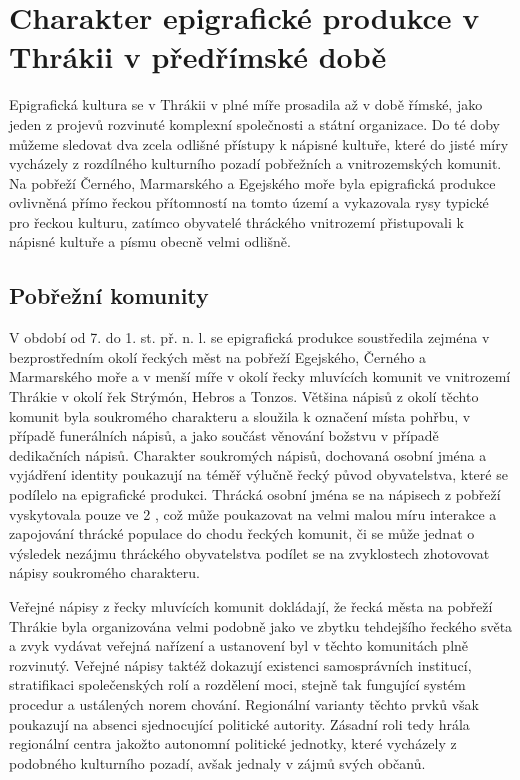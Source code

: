 \section[charakter-epigrafické-produkce-v-thrákii-v-předřímské-době]{Charakter epigrafické produkce v Thrákii v předřímské době}

Epigrafická kultura se v Thrákii v plné míře prosadila až v době římské, jako jeden z projevů rozvinuté komplexní společnosti a státní organizace. Do té doby můžeme sledovat dva zcela odlišné přístupy k nápisné kultuře, které do jisté míry vycházely z rozdílného kulturního pozadí pobřežních a vnitrozemských komunit. Na pobřeží Černého, Marmarského a Egejského moře byla epigrafická produkce ovlivněná přímo řeckou přítomností na tomto území a vykazovala rysy typické pro řeckou kulturu, zatímco obyvatelé thráckého vnitrozemí přistupovali k nápisné kultuře a písmu obecně velmi odlišně.

\subsection[pobřežní-komunity]{Pobřežní komunity}

V období od 7. do 1. st. př. n. l. se epigrafická produkce soustředila zejména v bezprostředním okolí řeckých měst na pobřeží Egejského, Černého a Marmarského moře a v menší míře v okolí řecky mluvících komunit ve vnitrozemí Thrákie v okolí řek Strýmón, Hebros a Tonzos. Většina nápisů z okolí těchto komunit byla soukromého charakteru a sloužila k označení místa pohřbu, v případě funerálních nápisů, a jako součást věnování božstvu v případě dedikačních nápisů. Charakter soukromých nápisů, dochovaná osobní jména a vyjádření identity poukazují na téměř výlučně řecký původ obyvatelstva, které se podílelo na epigrafické produkci. Thrácká osobní jména se na nápisech z pobřeží vyskytovala pouze ve 2 , což může poukazovat na velmi malou míru interakce a zapojování thrácké populace do chodu řeckých komunit, či se může jednat o výsledek nezájmu thráckého obyvatelstva podílet se na zvyklostech zhotovovat nápisy soukromého charakteru.

Veřejné nápisy z řecky mluvících komunit dokládají, že řecká města na pobřeží Thrákie byla organizována velmi podobně jako ve zbytku tehdejšího řeckého světa a zvyk vydávat veřejná nařízení a ustanovení byl v těchto komunitách plně rozvinutý. Veřejné nápisy taktéž dokazují existenci samosprávních institucí, stratifikaci společenských rolí a rozdělení moci, stejně tak fungující systém procedur a ustálených norem chování. Regionální varianty těchto prvků však poukazují na absenci sjednocující politické autority. Zásadní roli tedy hrála regionální centra jakožto autonomní politické jednotky, které vycházely z podobného kulturního pozadí, avšak jednaly v zájmů svých občanů.

